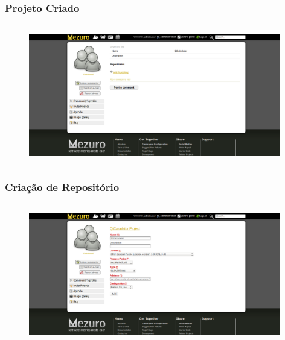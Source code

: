 \documentclass{beamer}
\begin{document}
    \begin{frame}
      \frametitle{Projeto Criado}
      \framesubtitle{}
    
      \begin{figure}
        \begin{center}
          \includegraphics[width=11cm, height=6cm]{images/06-project-created.png}
          \label{fig:project-created}
        \end{center}
      \end{figure}
    \end{frame}
    
    \begin{frame}
      \frametitle{Criação de Repositório}
      \framesubtitle{}
    
      \begin{figure}
        \begin{center}
          \includegraphics[width=11cm, height=6cm]{images/07-repository-creation.png}
          \label{fig:repository-creation}
        \end{center}
      \end{figure}
    \end{frame}
    
\end{document}
